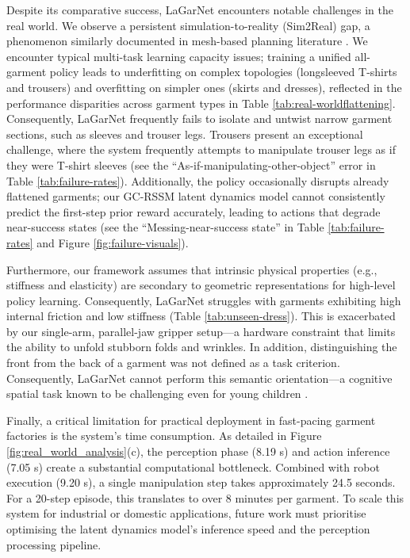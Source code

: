 \documentclass[journal]{IEEEtran}
\begin{document}
Despite its comparative success, LaGarNet encounters notable challenges in the real world. We observe a persistent simulation-to-reality (Sim2Real) gap, a phenomenon similarly documented in mesh-based planning literature \cite{huang2022mesh, lin2022learning}. We encounter typical multi-task learning capacity issues; training a unified all-garment policy leads to underfitting on complex topologies (longsleeved T-shirts and trousers) and overfitting on simpler ones (skirts and dresses), reflected in the performance disparities across garment types in Table \ref{tab:real-worldflattening}. Consequently, LaGarNet frequently fails to isolate and untwist narrow garment sections, such as sleeves and trouser legs. Trousers present an exceptional challenge, where the system frequently attempts to manipulate trouser legs as if they were T-shirt sleeves (see the ``As-if-manipulating-other-object'' error in Table \ref{tab:failure-rates}). Additionally, the policy occasionally disrupts already flattened garments; our GC-RSSM latent dynamics model cannot consistently predict the first-step prior reward accurately, leading to actions that degrade near-success states (see the ``Messing-near-success state'' in Table \ref{tab:failure-rates} and Figure \ref{fig:failure-visuals}).

Furthermore, our framework assumes that intrinsic physical properties (e.g., stiffness and elasticity) are secondary to geometric representations for high-level policy learning. Consequently, LaGarNet struggles with garments exhibiting high internal friction and low stiffness (Table \ref{tab:unseen-dress}). This is exacerbated by our single-arm, parallel-jaw gripper setup---a hardware constraint that limits the ability to unfold stubborn folds and wrinkles. In addition, distinguishing the front from the back of a garment was not defined as a task criterion. Consequently, LaGarNet cannot perform this semantic orientation---a cognitive spatial task known to be challenging even for young children \cite{paoletti2012pink}.

Finally, a critical limitation for practical deployment in fast-pacing garment factories is the system's time consumption. As detailed in Figure \ref{fig:real_world_analysis}(c), the perception phase (8.19 s) and action inference (7.05 s) create a substantial computational bottleneck. Combined with robot execution (9.20 s), a single manipulation step takes approximately 24.5 seconds. For a 20-step episode, this translates to over 8 minutes per garment. To scale this system for industrial or domestic applications, future work must prioritise optimising the latent dynamics model's inference speed and the perception processing pipeline.
\end{document}
